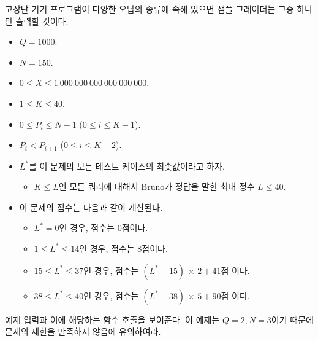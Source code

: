 \begin{problem}{고장난 기기}
	프로그램이 다양한 오답의 종류에 속해 있으면 샘플 그레이더는 그중 하나만 출력할 것이다.
	
	\Constraints
	\begin{itemize}
		\item $Q = 1000$.
		\item $N = 150$.
		\item $0 \le X \le 1\ 000\ 000\ 000\ 000\ 000\ 000$.
		\item $1 \le K \le 40$.
		\item $0 \le P_i \le N-1$ ($0 \le i \le K-1$).
		\item $P_i < P_{i+1}$ ($0 \le i \le K-2$).
	\end{itemize}
	
	\Scoring
	
	\begin{itemize}
		\item $L^*$를 이 문제의 모든 테스트 케이스의 최솟값이라고 하자.
		\begin{itemize}
			\item $K \le L$인 모든 쿼리에 대해서 Bruno가 정답을 말한 최대 정수 $L \le 40$.
		\end{itemize}
		\item 이 문제의 점수는 다음과 같이 계산된다.
		\begin{itemize}
			\item $L^* = 0$인 경우, 점수는 0점이다.
			\item $1 \le L^* \le 14$인 경우, 점수는 8점이다.
			\item $15 \le L^* \le 37$인 경우, 점수는 $(L^* - 15)$ × $2 + 41$점 이다.
			\item $38 \le L^* \le 40$인 경우, 점수는 $(L^* - 38)$ × $5 + 90$점 이다.
		\end{itemize}
	\end{itemize}
	
	

	\Examples
	
	예제 입력과 이에 해당하는 함수 호출을 보여준다. 이 예제는 $Q=2, N=3$이기 때문에 문제의 제한을 만족하지 않음에 유의하여라.
	
	
	

\end{problem}
